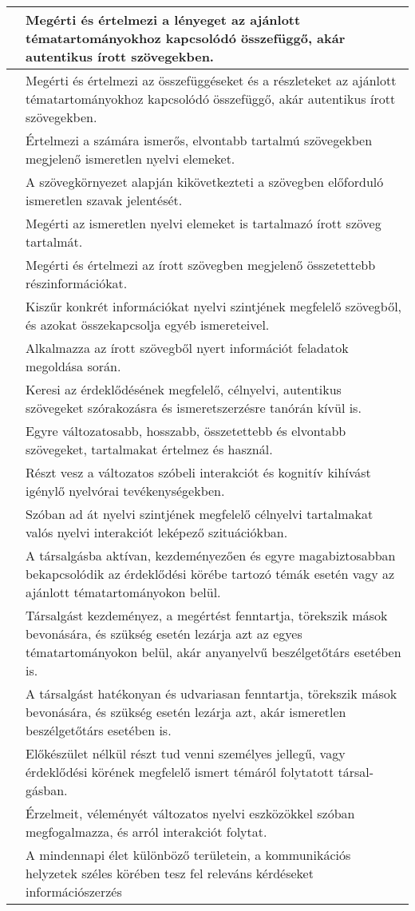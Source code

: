 \begin{longtable}[]{p{\evflength}@{\strut}>{\begin{minipage}{\columnlength}\strut}l<{\strut\end{minipage}}}
\tabularnewline
\hline
&
  Megérti és értelmezi a lényeget az ajánlott tématartományokhoz
  kapcsolódó összefüggő, akár autentikus írott szövegekben.
\tabularnewline
\hline
&
  Megérti és értelmezi az összefüggéseket és a részleteket az ajánlott
  tématartományokhoz kapcsolódó összefüggő, akár autentikus írott
  szövegekben.
\tabularnewline
\hline
&
  Értelmezi a számára ismerős, elvontabb tartalmú szövegekben megjelenő
  ismeretlen nyelvi elemeket.
\tabularnewline
\hline
&
  A szövegkörnyezet alapján kikövetkezteti a szövegben előforduló
  ismeretlen szavak jelentését.
\tabularnewline
\hline
&
  Megérti az ismeretlen nyelvi elemeket is tartalmazó írott szöveg
  tartalmát.
\tabularnewline
\hline
&
  Megérti és értelmezi az írott szövegben megjelenő összetettebb
  részinformációkat.
\tabularnewline
\hline
&
  Kiszűr konkrét információkat nyelvi szintjének megfelelő szövegből, és
  azokat összekapcsolja egyéb ismereteivel.
\tabularnewline
\hline
&
  Alkalmazza az írott szövegből nyert információt feladatok megoldása
  során.
\tabularnewline
\hline
&
  Keresi az érdeklődésének megfelelő, célnyelvi, autentikus szövegeket
  szórakozásra és ismeretszerzésre tanórán kívül is.
\tabularnewline
\hline
&
  Egyre változatosabb, hosszabb, összetettebb és elvontabb szövegeket,
  tartalmakat értelmez és használ.
\tabularnewline
\hline
&
  Részt vesz a változatos szóbeli interakciót és kognitív kihívást
  igénylő nyelvórai tevékenységekben.
\tabularnewline
\hline
&
  Szóban ad át nyelvi szintjének megfelelő célnyelvi tartalmakat valós
  nyelvi interakciót leképező szituációkban.
\tabularnewline
\hline
&
  A társalgásba aktívan, kezdeményezően és egyre magabiztosabban
  bekapcsolódik az érdeklődési körébe tartozó témák esetén vagy az
  ajánlott tématartományokon belül.
\tabularnewline
\hline
&
  Társalgást kezdeményez, a megértést fenntartja, törekszik mások
  bevonására, és szükség esetén lezárja azt az egyes tématartományokon
  belül, akár anyanyelvű beszélgetőtárs esetében is.
\tabularnewline
\hline
&
  A társalgást hatékonyan és udvariasan fenntartja, törekszik mások
  bevonására, és szükség esetén lezárja azt, akár ismeretlen
  beszélgetőtárs esetében is.
\tabularnewline
\hline
&
  Előkészület nélkül részt tud venni személyes jellegű, vagy érdeklődési
  körének megfelelő ismert témáról folytatott társal-\break gásban.
\tabularnewline
\hline
&
  Érzelmeit, véleményét változatos nyelvi eszközökkel szóban
  megfogalmazza, és arról interakciót folytat.
\tabularnewline
\hline
&
  A mindennapi élet különböző területein, a kommunikációs helyzetek
  széles körében tesz fel releváns kérdéseket információszerzés

\end{longtable}
